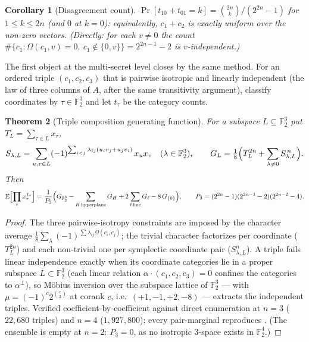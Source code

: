 \documentclass[11pt,a4paper]{article}
\theoremstyle{plain}
\newtheorem{theorem}{Theorem}[section]
\newtheorem{corollary}[theorem]{Corollary}
\theoremstyle{definition}
\newcommand{\F}{\mathbb{F}}
\newcommand{\E}{\mathbb{E}}
\begin{document}
\begin{corollary}[Disagreement count]
\label{cor:disagree}
$\Pr[t_{10} + t_{01} = k] = \binom{2n}{k}/(2^{2n}-1)$ for $1 \le k \le 2n$ (and $0$ at $k=0$): equivalently, $c_1 + c_2$ is exactly uniform over the non-zero vectors. (Directly: for each $v \neq 0$ the count $\#\{c_1 : \Omega(c_1, v) = 0,\ c_1 \notin \{0, v\}\} = 2^{2n-1}-2$ is $v$-independent.)
\end{corollary}

The first object at the multi-secret level closes by the same method. For an ordered triple $(c_1,c_2,c_3)$ that is pairwise isotropic and linearly independent (the law of three columns of $A$, after the same transitivity argument), classify coordinates by $\tau \in \F_2^3$ and let $t_\tau$ be the category counts.

\begin{theorem}[Triple composition generating function]
\label{thm:triple-gf}
For a subspace $L \subseteq \F_2^3$ put $T_L = \sum_{\tau \in L} x_\tau$,
\[
S_{\lambda, L} = \sum_{u, v \in L} (-1)^{\sum_{i<j} \lambda_{ij}(u_i v_j + u_j v_i)}\, x_u x_v \quad (\lambda \in \F_2^3),
\qquad
G_L = \tfrac18\Bigl(T_L^{2n} + \sum_{\lambda \neq 0} S_{\lambda, L}^{\,n}\Bigr).
\]
Then
\[
\E\Bigl[\prod_\tau x_\tau^{\,t_\tau}\Bigr]
= \frac{1}{P_3}\Bigl(G_{\F_2^3} - \sum_{H \,\mathrm{hyperplane}} G_H + 2\sum_{\ell\,\mathrm{line}} G_\ell - 8\, G_{\{0\}}\Bigr),
\qquad
P_3 = (2^{2n}-1)(2^{2n-1}-2)(2^{2n-2}-4).
\]
\end{theorem}

\begin{proof}
The three pairwise-isotropy constraints are imposed by the character average $\tfrac18 \sum_{\lambda}(-1)^{\sum \lambda_{ij}\Omega(c_i,c_j)}$; the trivial character factorizes per coordinate ($T_L^{2n}$) and each non-trivial one per symplectic coordinate pair ($S_{\lambda,L}^n$). A triple fails linear independence exactly when its coordinate categories lie in a proper subspace $L \subset \F_2^3$ (each linear relation $\alpha \cdot (c_1,c_2,c_3) = 0$ confines the categories to $\alpha^{\perp}$), so M\"obius inversion over the subspace lattice of $\F_2^3$ --- with $\mu = (-1)^c 2^{\binom{c}{2}}$ at corank $c$, i.e.\ $(+1, -1, +2, -8)$ --- extracts the independent triples. Verified coefficient-by-coefficient against direct enumeration at $n = 3$ ($22{,}680$ triples) and $n = 4$ ($1{,}927{,}800$); every pair-marginal reproduces . (The ensemble is empty at $n = 2$: $P_3 = 0$, as no isotropic $3$-space exists in $\F_2^4$.)
\end{proof}
\end{document}
